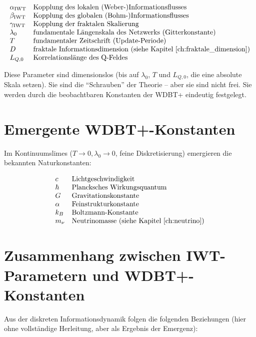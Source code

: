 \[
\begin{array}{ll}
\alpha_{\text{IWT}} & \text{Kopplung des lokalen (Weber-)Informationsflusses} \\
\beta_{\text{IWT}} & \text{Kopplung des globalen (Bohm-)Informationsflusses} \\
\gamma_{\text{IWT}} & \text{Kopplung der fraktalen Skalierung} \\
\lambda_0 & \text{fundamentale Längenskala des Netzwerks (Gitterkonstante)} \\
T & \text{fundamentaler Zeitschrift (Update-Periode)} \\
D & \text{fraktale Informationsdimension (siehe Kapitel~\ref{ch:fraktale_dimension})} \\
L_{Q,0} & \text{Korrelationslänge des Q-Feldes}
\end{array}
\]

Diese Parameter sind dimensionslos (bis auf \( \lambda_0 \), \( T \) und \( L_{Q,0} \), die eine absolute Skala setzen). Sie sind die \enquote{Schrauben} der Theorie – aber sie sind nicht frei. Sie werden durch die beobachtbaren Konstanten der WDBT+ eindeutig festgelegt.

\section{Emergente WDBT+-Konstanten}
\label{sec:wdbt_konstanten}

Im Kontinuumslimes (\( T \to 0, \lambda_0 \to 0 \), feine Diskretisierung) emergieren die bekannten Naturkonstanten:

\[
\begin{array}{ll}
c & \text{Lichtgeschwindigkeit} \\
\hbar & \text{Plancksches Wirkungsquantum} \\
G & \text{Gravitationskonstante} \\
\alpha & \text{Feinstrukturkonstante} \\
k_B & \text{Boltzmann-Konstante} \\
m_\nu & \text{Neutrinomasse (siehe Kapitel~\ref{ch:neutrino})}
\end{array}
\]

\section{Zusammenhang zwischen IWT-Parametern und WDBT+-Konstanten}
\label{sec:parameter_relationen}

Aus der diskreten Informationsdynamik folgen die folgenden Beziehungen (hier ohne vollständige Herleitung, aber als Ergebnis der Emergenz):

